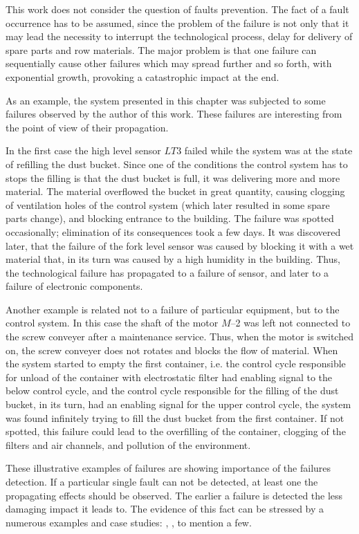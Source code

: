 This work does not consider the question of faults prevention. The fact of a
fault occurrence has to be assumed, since the problem of the failure is not
only that it may lead the necessity to interrupt the technological process,
delay for delivery of spare parts and row materials. The major problem is that
one failure can sequentially cause other failures which may spread further
and so forth, with exponential growth, provoking a catastrophic impact at the
end.

As an example, the system presented in this chapter was subjected to 
some failures observed by the author of this work. These failures are
interesting from the point of view of their propagation.

In the first case the high level sensor $LT3$ failed while the system was at the
state of refilling the dust bucket. Since one of the conditions the control
system has to stops the filling is that the dust bucket is full, it was
delivering more and more material. The material overflowed the bucket in great
quantity, causing clogging of ventilation holes of the control system (which
later resulted in some spare parts change), and blocking entrance to the
building. The failure was spotted occasionally; elimination of its consequences
took a few days. It was discovered later, that the failure of the fork level
sensor was caused by blocking it with a wet material that, in its turn was
caused by a high humidity in the building. Thus, the technological failure has
propagated to a failure of sensor, and later to a failure of electronic
components.

Another example is related not to a failure of particular equipment, but to the
control system. In this case the shaft of the motor $M$--2 was left not
connected to the screw conveyer after a maintenance service. Thus, when the
motor is switched on, the screw conveyer does not rotates and blocks the flow of
material. When the system started to empty the first container, i.e.
the control cycle responsible for unload of the container with electrostatic
filter had enabling signal to the below control cycle, and the control cycle
responsible for the filling of the dust bucket, in its turn, had an enabling
signal for the upper control cycle, the system was found infinitely trying to
fill the dust bucket from the first container. If not spotted, this failure
could lead to the overfilling of the container, clogging of the filters and air
channels, and pollution of the environment.

These illustrative examples of failures are showing importance of the failures
detection. If a particular single fault can not be detected, at least one
the propagating effects should be observed. The earlier a failure is detected
the less damaging impact it leads to. The evidence of this fact can be stressed
by a numerous examples and case studies: \cite{james_failure},
\cite{forensic_failre_analysis}, \cite{arora_failures_2007} to mention a few.


